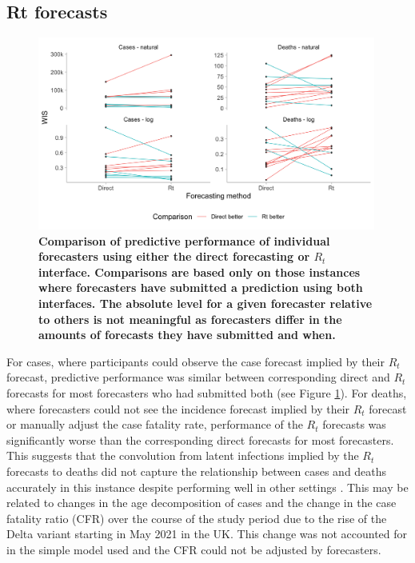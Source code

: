 \documentclass[10pt,a4paper,twocolumn]{article}
\begin{document}
\subsection*{Rt forecasts}

\begin{figure}
\centering
\includegraphics[width=0.99\textwidth]{../output/figures/comparison-direct-rt-individual.png}
\caption{\bf{Comparison of predictive performance of individual forecasters using either the direct forecasting or $R_t$ interface}. Comparisons are based only on those instances where forecasters have submitted a prediction using both interfaces. The absolute level for a given forecaster relative to others is not meaningful as forecasters differ in the amounts of forecasts they have submitted and when.}
\label{fig:comparison-direct-rt-individual}
\end{figure}

For cases, where participants could observe the case forecast implied by their $R_t$ forecast, predictive performance was similar between corresponding direct and $R_t$ forecasts for most forecasters who had submitted both (see Figure \ref{fig:comparison-direct-rt-individual}). For deaths, where forecasters could not see the incidence forecast implied by their $R_t$ forecast or manually adjust the case fatality rate, performance of the $R_t$ forecasts was significantly worse than the corresponding direct forecasts for most forecasters. This suggests that the convolution from latent infections implied by the $R_t$ forecasts to deaths did not capture the relationship between cases and deaths accurately in this instance despite performing well in other settings \citep{meakinComparativeAssessmentMethods2022}. This may be related to changes in the age decomposition of cases and the change in the case fatality ratio (CFR) over the course of the study period due to the rise of the Delta variant starting in May 2021 in the UK. This change was not accounted for in the simple model used and the CFR could not be adjusted by forecasters.
\end{document}
